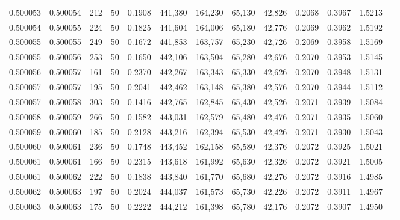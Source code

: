 \begin{tabular}{rrrrrrrrrrrrr}
0.500053 & 0.500054 & 212 &  50 &                                     0.1908 & 441,380 & 164,230 &  65,130 &  42,826 & 0.2068 & 0.3967 & 1.5213 \\
0.500054 & 0.500055 & 224 &  50 &                                     0.1825 & 441,604 & 164,006 &  65,180 &  42,776 & 0.2069 & 0.3962 & 1.5192 \\
0.500055 & 0.500055 & 249 &  50 &                                     0.1672 & 441,853 & 163,757 &  65,230 &  42,726 & 0.2069 & 0.3958 & 1.5169 \\
0.500055 & 0.500056 & 253 &  50 &                                     0.1650 & 442,106 & 163,504 &  65,280 &  42,676 & 0.2070 & 0.3953 & 1.5145 \\
0.500056 & 0.500057 & 161 &  50 &                                     0.2370 & 442,267 & 163,343 &  65,330 &  42,626 & 0.2070 & 0.3948 & 1.5131 \\
0.500057 & 0.500057 & 195 &  50 &                                     0.2041 & 442,462 & 163,148 &  65,380 &  42,576 & 0.2070 & 0.3944 & 1.5112 \\
0.500057 & 0.500058 & 303 &  50 &                                     0.1416 & 442,765 & 162,845 &  65,430 &  42,526 & 0.2071 & 0.3939 & 1.5084 \\
0.500058 & 0.500059 & 266 &  50 &                                     0.1582 & 443,031 & 162,579 &  65,480 &  42,476 & 0.2071 & 0.3935 & 1.5060 \\
0.500059 & 0.500060 & 185 &  50 &                                     0.2128 & 443,216 & 162,394 &  65,530 &  42,426 & 0.2071 & 0.3930 & 1.5043 \\
0.500060 & 0.500061 & 236 &  50 &                                     0.1748 & 443,452 & 162,158 &  65,580 &  42,376 & 0.2072 & 0.3925 & 1.5021 \\
0.500061 & 0.500061 & 166 &  50 &                                     0.2315 & 443,618 & 161,992 &  65,630 &  42,326 & 0.2072 & 0.3921 & 1.5005 \\
0.500061 & 0.500062 & 222 &  50 &                                     0.1838 & 443,840 & 161,770 &  65,680 &  42,276 & 0.2072 & 0.3916 & 1.4985 \\
0.500062 & 0.500063 & 197 &  50 &                                     0.2024 & 444,037 & 161,573 &  65,730 &  42,226 & 0.2072 & 0.3911 & 1.4967 \\
0.500063 & 0.500063 & 175 &  50 &                                     0.2222 & 444,212 & 161,398 &  65,780 &  42,176 & 0.2072 & 0.3907 & 1.4950 \\

\end{tabular}

